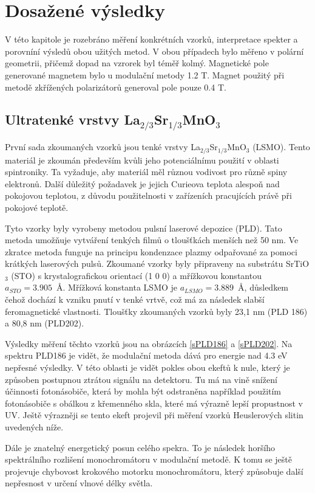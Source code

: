\chapter{Dosažené výsledky}
V této kapitole je rozebráno měření konkrétních vzorků, interpretace spekter a porovníní výsledů obou užitých metod. V obou případech 
bylo  měřeno v polární geometrii, přičemž dopad na vzrorek byl téměř kolmý. Magnetické pole generované magnetem bylo u modulační metody 1.2 T. Magnet 
použitý při metodě zkřížených polarizátorů generoval pole pouze 0.4 T.

\section{Ultratenké vrstvy La$_{2/3}$Sr$_{1/3}$MnO$_3$}
První sada zkoumaných vzorků jsou tenké vrstvy La$_{2/3}$Sr$_{1/3}$MnO$_3$ (LSMO). Tento materiál je zkoumán především kvůli jeho potenciálnímu použití v oblasti spintroniky. 
Ta vyžaduje, aby materiál měl různou vodivost pro různě spiny elektronů. Další důležitý požadavek je jejich Curieova teplota alespoň nad pokojovou teplotou, z důvodu 
použitelnosti v zařízeních pracujících právě při pokojové teplotě.

Tyto vzorky byly vyrobeny metodou pulsní laserové depozice (PLD). Tato metoda umožňuje vytváření tenkých filmů o tloušťkách menších než 50 nm. Ve zkratce metoda funguje na principu kondenzace plazmy odpařované za pomoci krátkých laserových pulsů. 
Zkoumané vzorky byly připraveny na substrátu SrTiO$_3$ (STO) s krystalografickou orientací (1 0 0) 
a mřížkovou konstantou $a_{STO}=3.905$~\AA. Mřížková konstanta LSMO je $a_{LSMO}=3.889$~\AA, důsledkem čehož dochází k vzniku pnutí v tenké vrtvě, což má za následek slabší feromagnetické vlastnosti. 
Tloušťky zkoumaných vzorků byly 23,1 nm (PLD 186) a 80,8 nm (PLD202). 

Výsledky měření těchto vzorků jsou na obrázcích \ref{sPLD186} a \ref{sPLD202}.
Na spektru PLD186 je vidět, že modulační metoda 
dává pro energie nad 4.3 eV nepřesné výsledky. V této oblasti je vidět pokles obou ekeftů k nule, 
který je způsoben postupnou ztrátou signálu na detektoru. Tu má na vině 
snížení účinnosti fotonásobiče, která by mohla být odstraněna například použitím fotonásobiče s obálkou z křemenného skla, které má výrazně lepší propustnost v UV.
Ještě výrazněji se tento ekeft projevil při měření vzorků Heuslerových slitin uvedených níže.

Dále je znatelný energetický posun celého spekra. To je následek horšího spektrálního rozlišení monochromátoru v modulační metodě. 
K tomu se ještě projevuje chybovost krokového motorku monochromátoru, který 
způsobuje další nepřesnost v určení vlnové délky světla.

